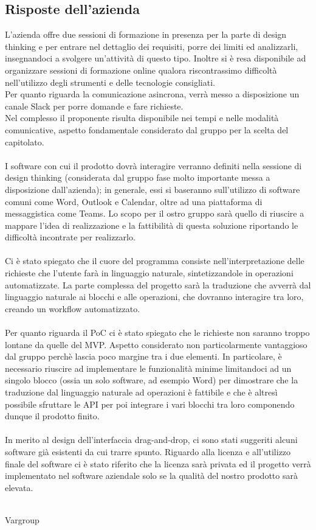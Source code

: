\subsection{Risposte dell'azienda}
L'azienda offre due sessioni di formazione in presenza per la parte di design thinking e per entrare nel dettaglio dei requisiti, porre dei limiti ed analizzarli, insegnandoci a svolgere un'attività di questo tipo.
Inoltre si è resa disponibile ad organizzare sessioni di formazione online qualora riscontrassimo difficoltà nell’utilizzo degli strumenti e delle tecnologie consigliati.\\
Per quanto riguarda la comunicazione asincrona, verrà messo a disposizione un canale Slack per porre domande e fare richieste.\\
Nel complesso il proponente risulta disponibile nei tempi e nelle modalità comunicative, aspetto fondamentale considerato dal gruppo per la scelta del capitolato.\\
\\
I software con cui il prodotto dovrà interagire verranno definiti nella sessione di design thinking (considerata dal gruppo fase molto importante messa a disposizione dall'azienda); in generale, essi si baseranno sull'utilizzo di software comuni come Word, Outlook e Calendar, oltre ad una piattaforma di messaggistica come Teams.
Lo scopo per il ostro gruppo sarà quello di riuscire a mappare l'idea di realizzazione e la fattibilità di questa soluzione riportando le difficoltà incontrate per realizzarlo.\\
\\
Ci è stato spiegato che il cuore del programma consiste nell'interpretazione delle richieste che l'utente farà in linguaggio naturale, sintetizzandole in operazioni automatizzate.
La parte complessa del progetto sarà la traduzione che avverrà dal linguaggio naturale ai blocchi e alle operazioni, che dovranno interagire tra loro, creando un workflow automatizzato.\\
\\
Per quanto riguarda il PoC ci è stato spiegato che le richieste non saranno troppo lontane da quelle del MVP. Aspetto considerato non particolarmente vantaggioso dal gruppo perchè lascia poco margine tra i due elementi.
In particolare, è necessario riuscire ad implementare le funzionalità minime limitandoci ad un singolo blocco (ossia un solo software, ad esempio Word) per dimostrare che la traduzione dal linguaggio naturale ad operazioni è fattibile e che è altresì possibile sfruttare le API per poi integrare i vari blocchi tra loro componendo dunque il prodotto finito.\\
\\
In merito al design dell'interfaccia drag-and-drop, ci sono stati suggeriti alcuni software già esistenti da cui trarre spunto.
Riguardo alla licenza e all'utilizzo finale del software ci è stato riferito che la licenza sarà privata ed il progetto verrà implementato nel software aziendale solo se la qualità del nostro prodotto sarà elevata.\\\\

\hfill\signature{Approvazione esterna}{Vargroup}